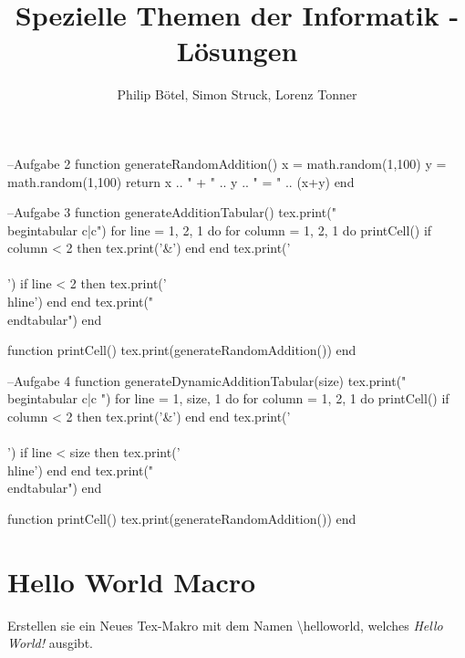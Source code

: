 \documentclass[a4paper]{article}
\title{Spezielle Themen der Informatik - Lösungen}
\author{Philip Bötel, Simon Struck, Lorenz Tonner}
\begin{document}
\maketitle
    
\begin{luacode}
    --Aufgabe 2
    function generateRandomAddition()
        x = math.random(1,100)
        y = math.random(1,100)
        return x .. " + " .. y .. " = " .. (x+y)
    end
    
    --Aufgabe 3
    function generateAdditionTabular()
        tex.print("\\begin{tabular} {c|c}")
        for line = 1, 2, 1 do
            for column = 1, 2, 1 do
                printCell()
                if column < 2 then
                    tex.print('&')
                end
            end
            tex.print('\\\\')
            if line < 2 then
                tex.print('\\hline')
            end
        end
        tex.print("\\end{tabular}")
    end

    function printCell()
        tex.print(generateRandomAddition())
    end
    
    --Aufgabe 4
    function generateDynamicAdditionTabular(size)
        tex.print("\\begin{tabular} {c|c} ")
        for line = 1, size, 1 do
            for column = 1, 2, 1 do
                printCell()
                if column < 2 then
                    tex.print('&')
                end
            end
            tex.print('\\\\')
            if line < size then
                tex.print('\\hline')
            end
        end
        tex.print("\\end{tabular}")
    end

    function printCell()
        tex.print(generateRandomAddition())
    end
\end{luacode}


\section{Hello World Macro}
    Erstellen sie ein Neues Tex-Makro mit dem Namen \textbackslash helloworld, welches \textit{Hello World!} ausgibt.
    
    \newcommand{\helloworld}[0]{}
    \helloworld
    
\end{document}
